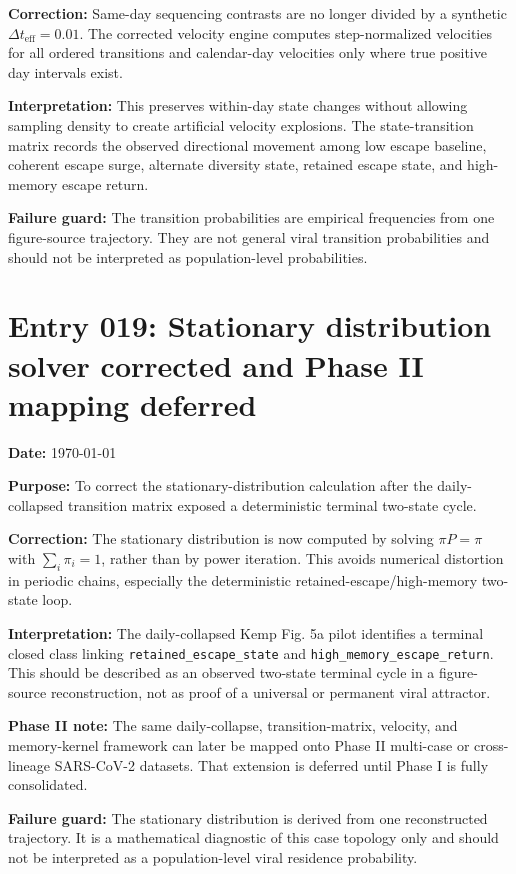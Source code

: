 \textbf{Correction:} Same-day sequencing contrasts are no longer divided by a synthetic \(\Delta t_{\mathrm{eff}} = 0.01\). The corrected velocity engine computes step-normalized velocities for all ordered transitions and calendar-day velocities only where true positive day intervals exist.

\textbf{Interpretation:} This preserves within-day state changes without allowing sampling density to create artificial velocity explosions. The state-transition matrix records the observed directional movement among low escape baseline, coherent escape surge, alternate diversity state, retained escape state, and high-memory escape return.

\textbf{Failure guard:} The transition probabilities are empirical frequencies from one figure-source trajectory. They are not general viral transition probabilities and should not be interpreted as population-level probabilities.


\section*{Entry 019: Stationary distribution solver corrected and Phase II mapping deferred}

\textbf{Date:} \today

\textbf{Purpose:} To correct the stationary-distribution calculation after the daily-collapsed transition matrix exposed a deterministic terminal two-state cycle.

\textbf{Correction:} The stationary distribution is now computed by solving \(\pi P = \pi\) with \(\sum_i \pi_i = 1\), rather than by power iteration. This avoids numerical distortion in periodic chains, especially the deterministic retained-escape/high-memory two-state loop.

\textbf{Interpretation:} The daily-collapsed Kemp Fig. 5a pilot identifies a terminal closed class linking \texttt{retained\_escape\_state} and \texttt{high\_memory\_escape\_return}. This should be described as an observed two-state terminal cycle in a figure-source reconstruction, not as proof of a universal or permanent viral attractor.

\textbf{Phase II note:} The same daily-collapse, transition-matrix, velocity, and memory-kernel framework can later be mapped onto Phase II multi-case or cross-lineage SARS-CoV-2 datasets. That extension is deferred until Phase I is fully consolidated.

\textbf{Failure guard:} The stationary distribution is derived from one reconstructed trajectory. It is a mathematical diagnostic of this case topology only and should not be interpreted as a population-level viral residence probability.


